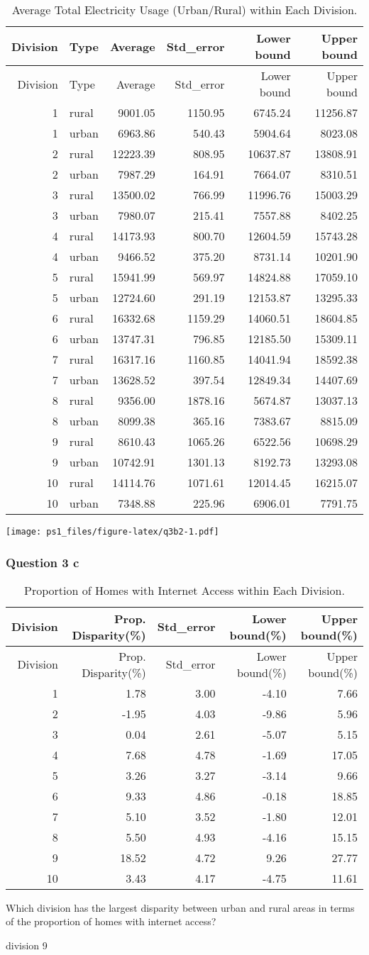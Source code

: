 \documentclass[]{article}
\begin{document}
\begin{longtable}[]{@{}rlrrrr@{}}
\caption{Average Total Electricity Usage (Urban/Rural) within Each
Division.}\tabularnewline
\toprule
Division & Type & Average & Std\_error & Lower bound & Upper
bound\tabularnewline
\midrule
\endfirsthead
\toprule
Division & Type & Average & Std\_error & Lower bound & Upper
bound\tabularnewline
\midrule
\endhead
1 & rural & 9001.05 & 1150.95 & 6745.24 & 11256.87\tabularnewline
1 & urban & 6963.86 & 540.43 & 5904.64 & 8023.08\tabularnewline
2 & rural & 12223.39 & 808.95 & 10637.87 & 13808.91\tabularnewline
2 & urban & 7987.29 & 164.91 & 7664.07 & 8310.51\tabularnewline
3 & rural & 13500.02 & 766.99 & 11996.76 & 15003.29\tabularnewline
3 & urban & 7980.07 & 215.41 & 7557.88 & 8402.25\tabularnewline
4 & rural & 14173.93 & 800.70 & 12604.59 & 15743.28\tabularnewline
4 & urban & 9466.52 & 375.20 & 8731.14 & 10201.90\tabularnewline
5 & rural & 15941.99 & 569.97 & 14824.88 & 17059.10\tabularnewline
5 & urban & 12724.60 & 291.19 & 12153.87 & 13295.33\tabularnewline
6 & rural & 16332.68 & 1159.29 & 14060.51 & 18604.85\tabularnewline
6 & urban & 13747.31 & 796.85 & 12185.50 & 15309.11\tabularnewline
7 & rural & 16317.16 & 1160.85 & 14041.94 & 18592.38\tabularnewline
7 & urban & 13628.52 & 397.54 & 12849.34 & 14407.69\tabularnewline
8 & rural & 9356.00 & 1878.16 & 5674.87 & 13037.13\tabularnewline
8 & urban & 8099.38 & 365.16 & 7383.67 & 8815.09\tabularnewline
9 & rural & 8610.43 & 1065.26 & 6522.56 & 10698.29\tabularnewline
9 & urban & 10742.91 & 1301.13 & 8192.73 & 13293.08\tabularnewline
10 & rural & 14114.76 & 1071.61 & 12014.45 & 16215.07\tabularnewline
10 & urban & 7348.88 & 225.96 & 6906.01 & 7791.75\tabularnewline
\bottomrule
\end{longtable}

\texttt{[image: ps1\_files/figure-latex/q3b2-1.pdf]}

\subsubsection{Question 3 c}\label{question-3-c}

\begin{longtable}[]{@{}rrrrr@{}}
\caption{Proportion of Homes with Internet Access within Each
Division.}\tabularnewline
\toprule
Division & Prop. Disparity(\%) & Std\_error & Lower bound(\%) & Upper
bound(\%)\tabularnewline
\midrule
\endfirsthead
\toprule
Division & Prop. Disparity(\%) & Std\_error & Lower bound(\%) & Upper
bound(\%)\tabularnewline
\midrule
\endhead
1 & 1.78 & 3.00 & -4.10 & 7.66\tabularnewline
2 & -1.95 & 4.03 & -9.86 & 5.96\tabularnewline
3 & 0.04 & 2.61 & -5.07 & 5.15\tabularnewline
4 & 7.68 & 4.78 & -1.69 & 17.05\tabularnewline
5 & 3.26 & 3.27 & -3.14 & 9.66\tabularnewline
6 & 9.33 & 4.86 & -0.18 & 18.85\tabularnewline
7 & 5.10 & 3.52 & -1.80 & 12.01\tabularnewline
8 & 5.50 & 4.93 & -4.16 & 15.15\tabularnewline
9 & 18.52 & 4.72 & 9.26 & 27.77\tabularnewline
10 & 3.43 & 4.17 & -4.75 & 11.61\tabularnewline
\bottomrule
\end{longtable}

Which division has the largest disparity between urban and rural areas
in terms of the proportion of homes with internet access?

division 9
\end{document}
